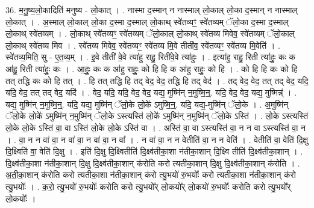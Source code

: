 \documentclass[17pt]{extarticle}
\begin{document}
36. म॒नु॒ष्य॒लो॒कादिति॑ मनुष्य - लो॒कात् । . नास्मा द॒स्मान् न नास्माल् लो॒काल् लो॒का द॒स्मान् न नास्माल् लो॒कात् । . अ॒स्माल् लो॒काल् लो॒का द॒स्मा द॒स्माल् लो॒काथ् स्वे॑तव्यꣳ॒॒ स्वे॑तव्यम् ॅलो॒का द॒स्मा द॒स्माल् लो॒काथ् स्वे॑तव्यम् । . लो॒काथ् स्वे॑तव्यꣳ॒॒ स्वे॑तव्यम् ॅलो॒काल् लो॒काथ् स्वे॑तव्य मिवेव॒ स्वे॑तव्यम् ॅलो॒काल् लो॒काथ् स्वे॑तव्य मिव । . स्वे॑तव्य मिवेव॒ स्वे॑तव्यꣳ॒॒ स्वे॑तव्य मि॒वे तीती॑व॒ स्वे॑तव्यꣳ॒॒ स्वे॑तव्य मि॒वेति॑ । . स्वे॑तव्य॒मिति॒ सु - ए॒त॒व्य॒म् । . इ॒वे तीती॑ वे॒वे त्या॑हु राहु॒ रिती॑वे॒वे त्या॑हुः । . इत्या॑हु राहु॒ रिती त्या॑हुः॒ कः क आ॑हु॒ रिती त्या॑हुः॒ कः । . आ॒हुः॒ कः क आ॑हु राहुः॒ को हि हि क आ॑हु राहुः॒ को हि । . को हि हि कः को हि तत् तद्धि कः को हि तत् । . हि तत् तद्धि हि तद् वेद॒ वेद॒ तद्धि हि तद् वेद॑ । . तद् वेद॒ वेद॒ तत् तद् वेद॒ यदि॒ यदि॒ वेद॒ तत् तद् वेद॒ यदि॑ । . वेद॒ यदि॒ यदि॒ वेद॒ वेद॒ यद्य॒ मुष्मि॑न् न॒मुष्मि॒न्॒. यदि॒ वेद॒ वेद॒ यद्य॒ मुष्मिन्न्॑ । . यद्य॒ मुष्मि॑न् न॒मुष्मि॒न्॒. यदि॒ यद्य॒ मुष्मि॑न् ॅलो॒के लो॒के॑ ऽमुष्मि॒न्॒. यदि॒ यद्य॒-मुष्मि॑न् ॅलो॒के । . अ॒मुष्मि॑न् ॅलो॒के लो॒के॑ ऽमुष्मि॑न् न॒मुष्मि॑न् ॅलो॒के ऽस्त्यस्ति॑ लो॒के॑ ऽमुष्मि॑न् न॒मुष्मि॑न् ॅलो॒के ऽस्ति॑ । . लो॒के ऽस्त्यस्ति॑ लो॒के लो॒के ऽस्ति॑ वा॒ वा ऽस्ति॑ लो॒के लो॒के ऽस्ति॑ वा । . अस्ति॑ वा॒ वा ऽस्त्यस्ति॑ वा॒ न न वा ऽस्त्यस्ति॑ वा॒ न । . वा॒ न न वा॑ वा॒ न वा॑ वा॒ न वा॑ वा॒ न वा᳚ । . न वा॑ वा॒ न न वेतीति॑ वा॒ न न वेति॑ । . वेतीति॑ वा॒ वेति॑ दि॒क्षु दि॒क्ष्विति॑ वा॒ वेति॑ दि॒क्षु । . इति॑ दि॒क्षु दि॒क्ष्वितीति॑ दि॒क्ष्व॑तीका॒शा न॑तीका॒शान् दि॒क्ष्वि तीति॑ दि॒क्ष्व॑तीका॒शान् । . दि॒क्ष्व॑तीका॒शा न॑तीका॒शान् दि॒क्षु दि॒क्ष्व॑तीका॒शान् क॑रोति करो त्यतीका॒शान् दि॒क्षु दि॒क्ष्व॑तीका॒शान् क॑रोति । . अ॒ती॒का॒शान् क॑रोति करो त्यतीका॒शा न॑तीका॒शान् क॑रो त्यु॒भयो॑ रु॒भयोः᳚ करो त्यतीका॒शा न॑तीका॒शान् क॑रो त्यु॒भयोः᳚ । . क॒रो॒ त्यु॒भयो॑ रु॒भयोः᳚ करोति करो त्यु॒भयो᳚र् लो॒कयो᳚र् लो॒कयो॑ रु॒भयोः᳚ करोति करो त्यु॒भयो᳚र् लो॒कयोः᳚ । \newline
\pagebreak
{}
\end{document}
